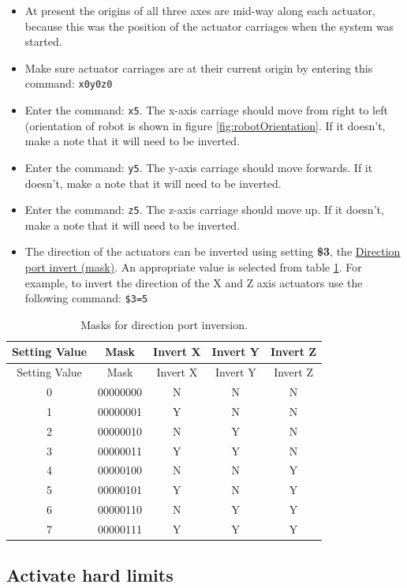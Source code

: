 \documentclass[]{book}
\providecommand{\tightlist}{%
  \setlength{\itemsep}{0pt}\setlength{\parskip}{0pt}}
\theoremstyle{definition}
\theoremstyle{definition}
\theoremstyle{remark}
\begin{document}
\begin{itemize}
\tightlist
\item
  At present the origins of all three axes are mid-way along each
  actuator, because this was the position of the actuator carriages when
  the system was started.
\item
  Make sure actuator carriages are at their current origin by entering
  this command: \texttt{x0y0z0}
\item
  Enter the command: \texttt{x5}. The x-axis carriage should move from
  right to left (orientation of robot is shown in figure
  \ref{fig:robotOrientation}. If it doesn't, make a note that it will
  need to be inverted.
\item
  Enter the command: \texttt{y5}. The y-axis carriage should move
  forwards. If it doesn't, make a note that it will need to be inverted.
\item
  Enter the command: \texttt{z5}. The z-axis carriage should move up. If
  it doesn't, make a note that it will need to be inverted.
\item
  The direction of the actuators can be inverted using setting
  \textbf{\$3}, the
  \href{https://github.com/gnea/grbl/wiki/Grbl-v1.1-Configuration\#3--direction-port-invert-mask}{Direction
  port invert (mask)}. An appropriate value is selected from table
  \ref{tab:invertMaskSettings}. For example, to invert the direction of
  the X and Z axis actuators use the following command: \texttt{\$3=5}
\end{itemize}

\begin{longtable}[]{@{}ccccc@{}}
\caption{\label{tab:invertMaskSettings} Masks for direction port
inversion.}\tabularnewline
\toprule
Setting Value & Mask & Invert X & Invert Y & Invert Z\tabularnewline
\midrule
\endfirsthead
\toprule
Setting Value & Mask & Invert X & Invert Y & Invert Z\tabularnewline
\midrule
\endhead
0 & 00000000 & N & N & N\tabularnewline
1 & 00000001 & Y & N & N\tabularnewline
2 & 00000010 & N & Y & N\tabularnewline
3 & 00000011 & Y & Y & N\tabularnewline
4 & 00000100 & N & N & Y\tabularnewline
5 & 00000101 & Y & N & Y\tabularnewline
6 & 00000110 & N & Y & Y\tabularnewline
7 & 00000111 & Y & Y & Y\tabularnewline
\bottomrule
\end{longtable}

\subsection{Activate hard limits}\label{activate-hard-limits}
\end{document}
